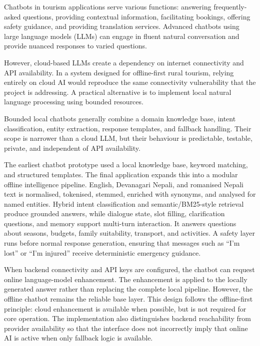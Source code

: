\documentclass[12pt,a4paper,oneside]{report}
\begin{document}
Chatbots in tourism applications serve various functions: answering frequently-asked questions, providing contextual information, facilitating bookings, offering safety guidance, and providing translation services. Advanced chatbots using large language models (LLMs) can engage in fluent natural conversation and provide nuanced responses to varied questions.

However, cloud-based LLMs create a dependency on internet connectivity and API availability. In a system designed for offline-first rural tourism, relying entirely on cloud AI would reproduce the same connectivity vulnerability that the project is addressing. A practical alternative is to implement local natural language processing using bounded resources.

Bounded local chatbots generally combine a domain knowledge base, intent classification, entity extraction, response templates, and fallback handling. Their scope is narrower than a cloud LLM, but their behaviour is predictable, testable, private, and independent of API availability.

The earliest chatbot prototype used a local knowledge base, keyword matching, and structured templates. The final application expands this into a modular offline intelligence pipeline. English, Devanagari Nepali, and romanised Nepali text is normalised, tokenised, stemmed, enriched with synonyms, and analysed for named entities. Hybrid intent classification and semantic/BM25-style retrieval produce grounded answers, while dialogue state, slot filling, clarification questions, and memory support multi-turn interaction. It answers questions about seasons, budgets, family suitability, transport, and activities. A safety layer runs before normal response generation, ensuring that messages such as ``I'm lost'' or ``I'm injured'' receive deterministic emergency guidance.

When backend connectivity and API keys are configured, the chatbot can request online language-model enhancement. The enhancement is applied to the locally generated answer rather than replacing the complete local pipeline. However, the offline chatbot remains the reliable base layer. This design follows the offline-first principle: cloud enhancement is available when possible, but is not required for core operation. The implementation also distinguishes backend reachability from provider availability so that the interface does not incorrectly imply that online AI is active when only fallback logic is available.
\end{document}
